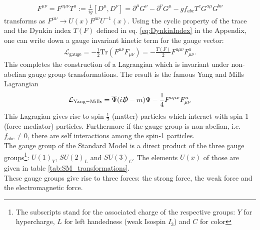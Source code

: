 \begin{align}
F^{\mu\nu} = F^{a\mu\nu}T^a := \frac{1}{ig}[D^\mu,D^\nu] = \partial^\mu G^\nu - \partial^\nu G^\mu - g f_{abc} T^c G^{a\mu}G^{b\nu}
\end{align}
transforms as $F^{\mu\nu} \to U(x)F^{\mu\nu}U^{-1}(x)$. Using the cyclic property of the trace and the Dynkin index $T(F)$ defined in eq. \eqref{eq:DynkinIndex} in the Appendix, one can write down a gauge invariant kinetic term for the gauge vector:
\begin{align}
\mathcal{L}_{\mathrm{gauge}} = - \frac{1}{2} \mathrm{Tr} \left( F^{\mu\nu}F_{\mu\nu} \right) = -\frac{T(F)}{2} F^{a\mu\nu}F^a_{\mu\nu}.
\end{align}
This completes the construction of a Lagrangian which is invariant under non-abelian gauge group transformations. The result is the famous Yang and Mills Lagrangian \cite{PhysRev.96.191}
\begin{align}
\mathcal{L}_{\mathrm{Yang-Mills}} = \overline{\Psi}(i\slashed{D} - m)\Psi - \frac{1}{4}F^{a\mu\nu}F^a_{\mu\nu}
\end{align}
This Lagragian gives rise to spin-$\frac{1}{2}$ (matter) particles which interact with spin-1 (force mediator) particles. Furthermore if the gauge group is non-abelian, i.e. $f_{abc} \neq 0$, there are self interactions among the spin-1 particles.\\
The gauge group of the Standard Model is a direct product of the three gauge groups\footnote{The subscripts stand for the associated charge of the respective groups: $Y$ for hypercharge, $L$ for left handedness (weak Isospin $I_3$) and $C$ for color}: $U(1)_Y$, $SU(2)_L$ and $SU(3)_C$. The elements $U(x)$ of those are given in table \ref{tab:SM_transformations}.\\
These gauge groups give rise to three forces: the strong force, the weak force and the electromagnetic force.
